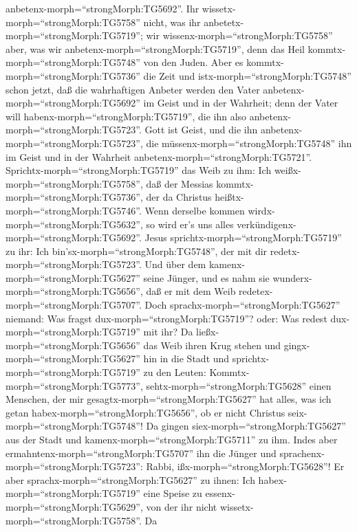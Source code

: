 anbetenx-morph=``strongMorph:TG5692''.  Ihr
wissetx-morph=``strongMorph:TG5758'' nicht, was ihr
anbetetx-morph=``strongMorph:TG5719''; wir
wissenx-morph=``strongMorph:TG5758'' aber, was wir
anbetenx-morph=``strongMorph:TG5719'', denn das Heil
kommtx-morph=``strongMorph:TG5748'' von den Juden.  Aber es
kommtx-morph=``strongMorph:TG5736'' die Zeit und
istx-morph=``strongMorph:TG5748'' schon jetzt, daß die wahrhaftigen
Anbeter werden den Vater anbetenx-morph=``strongMorph:TG5692'' im Geist
und in der Wahrheit; denn der Vater will
habenx-morph=``strongMorph:TG5719'', die ihn also
anbetenx-morph=``strongMorph:TG5723''.  Gott ist Geist, und
die ihn anbetenx-morph=``strongMorph:TG5723'', die
müssenx-morph=``strongMorph:TG5748'' ihn im Geist und in der Wahrheit
anbetenx-morph=``strongMorph:TG5721''. 
Sprichtx-morph=``strongMorph:TG5719'' das Weib zu ihm: Ich
weißx-morph=``strongMorph:TG5758'', daß der Messias
kommtx-morph=``strongMorph:TG5736'', der da Christus
heißtx-morph=``strongMorph:TG5746''. Wenn derselbe kommen
wirdx-morph=``strongMorph:TG5632'', so wird er's uns alles
verkündigenx-morph=``strongMorph:TG5692''.  Jesus
sprichtx-morph=``strongMorph:TG5719'' zu ihr: Ich
bin'sx-morph=``strongMorph:TG5748'', der mit dir
redetx-morph=``strongMorph:TG5723''.  Und über dem
kamenx-morph=``strongMorph:TG5627'' seine Jünger, und es nahm sie
wunderx-morph=``strongMorph:TG5656'', daß er mit dem Weib
redetex-morph=``strongMorph:TG5707''. Doch
sprachx-morph=``strongMorph:TG5627'' niemand: Was fragst
dux-morph=``strongMorph:TG5719''? oder: Was redest
dux-morph=``strongMorph:TG5719'' mit ihr?  Da
ließx-morph=``strongMorph:TG5656'' das Weib ihren Krug stehen und
gingx-morph=``strongMorph:TG5627'' hin in die Stadt und
sprichtx-morph=``strongMorph:TG5719'' zu den Leuten: 
Kommtx-morph=``strongMorph:TG5773'', sehtx-morph=``strongMorph:TG5628''
einen Menschen, der mir gesagtx-morph=``strongMorph:TG5627'' hat alles,
was ich getan habex-morph=``strongMorph:TG5656'', ob er nicht Christus
seix-morph=``strongMorph:TG5748''!  Da gingen
siex-morph=``strongMorph:TG5627'' aus der Stadt und
kamenx-morph=``strongMorph:TG5711'' zu ihm.  Indes aber
ermahntenx-morph=``strongMorph:TG5707'' ihn die Jünger und
sprachenx-morph=``strongMorph:TG5723'': Rabbi,
ißx-morph=``strongMorph:TG5628''!  Er aber
sprachx-morph=``strongMorph:TG5627'' zu ihnen: Ich
habex-morph=``strongMorph:TG5719'' eine Speise zu
essenx-morph=``strongMorph:TG5629'', von der ihr nicht
wissetx-morph=``strongMorph:TG5758''.  Da
